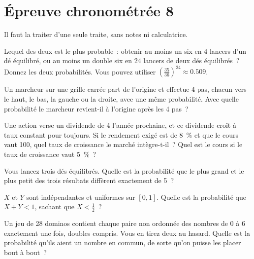 \chapter{Épreuve chronométrée 8}\label{ch:iv1:timed-test-8}

\begin{ivtrains}
Il faut la traiter d'une seule traite, sans notes ni calculatrice.
\end{ivtrains}


\begin{question}\label{iq:iv1:timed-test-8:1}
Lequel des deux est le plus probable~: obtenir au moins un six en 4 lancers d'un dé équilibré, ou au moins un double six en 24 lancers de deux dés équilibrés~? Donnez les deux probabilités. Vous pouvez utiliser $(\frac{35}{36})^{24} \approx 0.509$.
\end{question}

\begin{question}\label{iq:iv1:timed-test-8:2}
Un marcheur sur une grille carrée part de l'origine et effectue 4 pas, chacun vers le haut, le bas, la gauche ou la droite, avec une même probabilité. Avec quelle probabilité le marcheur revient-il à l'origine après les 4 pas~?
\end{question}

\begin{question}\label{iq:iv1:timed-test-8:3}
Une action verse un dividende de 4 l'année prochaine, et ce dividende croît à taux constant pour toujours. Si le rendement exigé est de 8~\% et que le cours vaut 100, quel taux de croissance le marché intègre-t-il~? Quel est le cours si le taux de croissance vaut 5~\%~?
\end{question}

\begin{question}\label{iq:iv1:timed-test-8:4}
Vous lancez trois dés équilibrés. Quelle est la probabilité que le plus grand et le plus petit des trois résultats diffèrent exactement de 5~?
\end{question}

\begin{question}\label{iq:iv1:timed-test-8:5}
$X$ et $Y$ sont indépendantes et uniformes sur $[0, 1]$. Quelle est la probabilité que $X + Y < 1$, sachant que $X < \frac12$~?
\end{question}

\begin{question}\label{iq:iv1:timed-test-8:6}
Un jeu de 28 dominos contient chaque paire non ordonnée des nombres de 0 à 6 exactement une fois, doubles compris. Vous en tirez deux au hasard. Quelle est la probabilité qu'ils aient un nombre en commun, de sorte qu'on puisse les placer bout à bout~?
\end{question}

